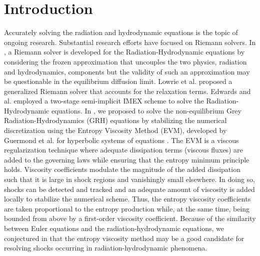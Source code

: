 \documentclass[review]{elsarticle}
\begin{document}
\section{Introduction}\label{sec:intro}
%
Accurately solving the radiation and hydrodynamic equations is the topic of ongoing research. 
Substantial research efforts have focused on Riemann solvers. In
\cite{Balsara},  a Riemann solver is developed for the Radiation-Hydrodynamic equations by considering the frozen approximation 
that uncouples the two physics, radiation and hydrodynamics, components but the validity of such an approximation may be questionable 
in the equilibrium diffusion limit. 
Lowrie et al. \cite{LowrieMorelHittinger} proposed a generalized Riemann solver that accounts for the relaxation terms. 
Edwards and al. \cite{EdwardsMorelLowrie} employed a two-stage semi-implicit IMEX scheme to solve the Radiation-Hydrodynamic equations. 
%
%
In \cite{our_jcp_radhy_paper}, we proposed to solve the non-equilibrium Grey Radiation-Hydrodynamics (GRH) equations by stabilizing the numerical discretization 
using the Entropy Viscosity Method (EVM), developed by Guermond et al. for hyperbolic systems of equations \cite{jlg1, jlg2}. 
%
The EVM is a viscous regularization technique where adequate dissipation terms (viscous fluxes) are added to the governing laws while ensuring 
that the entropy minimum principle holds. Viscosity coefficients modulate the magnitude of the added dissipation such that it is large in shock regions and vanishingly 
small elsewhere. In doing so, shocks can be detected and tracked and an adequate amount of viscosity is added locally to stabilize the numerical scheme. 
Thus, the entropy viscosity coefficients are taken proportional to the entropy production while, at the same time, being bounded from above by a first-order 
viscosity coefficient.
Because of the similarity between Euler equations and the radiation-hydrodynamic equations, we conjectured in \cite{our_jcp_radhy_paper} that the entropy 
viscosity method may be a good candidate for resolving shocks occurring in radiation-hydrodynamic phenomena.
\end{document}
